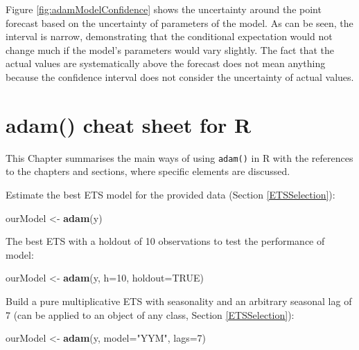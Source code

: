 \documentclass[]{book}
\newenvironment{Shaded}{\begin{snugshade}}{\end{snugshade}}
\newcommand{\DataTypeTok}[1]{\textcolor[rgb]{0.13,0.29,0.53}{#1}}
\newcommand{\DecValTok}[1]{\textcolor[rgb]{0.00,0.00,0.81}{#1}}
\newcommand{\KeywordTok}[1]{\textcolor[rgb]{0.13,0.29,0.53}{\textbf{#1}}}
\newcommand{\NormalTok}[1]{#1}
\newcommand{\OtherTok}[1]{\textcolor[rgb]{0.56,0.35,0.01}{#1}}
\newcommand{\StringTok}[1]{\textcolor[rgb]{0.31,0.60,0.02}{#1}}
\theoremstyle{definition}
\theoremstyle{definition}
\theoremstyle{definition}
\theoremstyle{definition}
\theoremstyle{remark}
\begin{document}
Figure \ref{fig:adamModelConfidence} shows the uncertainty around the point forecast based on the uncertainty of parameters of the model. As can be seen, the interval is narrow, demonstrating that the conditional expectation would not change much if the model's parameters would vary slightly. The fact that the actual values are systematically above the forecast does not mean anything because the confidence interval does not consider the uncertainty of actual values.

\hypertarget{cheatSheet}{%
\chapter{adam() cheat sheet for R}\label{cheatSheet}}

This Chapter summarises the main ways of using \texttt{adam()} in R with the references to the chapters and sections, where specific elements are discussed.

Estimate the best ETS model for the provided data (Section \ref{ETSSelection}):

\begin{Shaded}
\begin{Highlighting}[]
\NormalTok{ourModel <-}\StringTok{ }\KeywordTok{adam}\NormalTok{(y)}
\end{Highlighting}
\end{Shaded}

The best ETS with a holdout of 10 observations to test the performance of model:

\begin{Shaded}
\begin{Highlighting}[]
\NormalTok{ourModel <-}\StringTok{ }\KeywordTok{adam}\NormalTok{(y, }\DataTypeTok{h=}\DecValTok{10}\NormalTok{, }\DataTypeTok{holdout=}\OtherTok{TRUE}\NormalTok{)}
\end{Highlighting}
\end{Shaded}

Build a pure multiplicative ETS with seasonality and an arbitrary seasonal lag of 7 (can be applied to an object of any class, Section \ref{ETSSelection}):

\begin{Shaded}
\begin{Highlighting}[]
\NormalTok{ourModel <-}\StringTok{ }\KeywordTok{adam}\NormalTok{(y, }\DataTypeTok{model=}\StringTok{"YYM"}\NormalTok{, }\DataTypeTok{lags=}\DecValTok{7}\NormalTok{)}
\end{Highlighting}
\end{Shaded}
\end{document}
